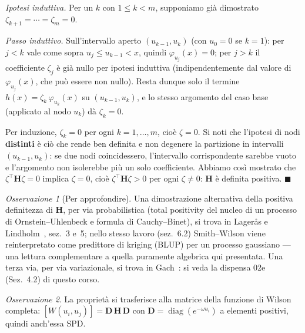 \documentclass[11pt,a4paper]{article}
\theoremstyle{plain}
\theoremstyle{definition}
\theoremstyle{remark}
\newtheorem*{osservazione}{Osservazione}
\newcommand{\Hmat}{\mathbf{H}}
\newcommand{\transp}{^{\!\top}}
\begin{document}
\emph{Ipotesi induttiva.} Per un $k$ con $1\le k<m$, supponiamo gi\`a dimostrato
$\zeta_{k+1}=\cdots=\zeta_m=0$.

\emph{Passo induttivo.} Sull'intervallo aperto $(u_{k-1},u_k)$ (con $u_0=0$ se $k=1$): per
$j<k$ vale come sopra $u_j\le u_{k-1}<x$, quindi $\varphi_{u_j}(x)=0$; per $j>k$ il
coefficiente $\zeta_j$ \`e gi\`a nullo per ipotesi induttiva (indipendentemente dal valore di
$\varphi_{u_j}(x)$, che pu\`o essere non nullo). Resta dunque solo il termine
$h(x)=\zeta_k\,\varphi_{u_k}(x)$ su $(u_{k-1},u_k)$, e lo stesso argomento del caso base
(applicato al nodo $u_k$) d\`a $\zeta_k=0$.

Per induzione, $\zeta_k=0$ per ogni $k=1,\ldots,m$, cio\`e $\zeta=0$. Si noti che l'ipotesi di
nodi \textbf{distinti} \`e ci\`o che rende ben definita e non degenere la partizione in
intervalli $(u_{k-1},u_k)$: se due nodi coincidessero, l'intervallo corrispondente sarebbe
vuoto e l'argomento non isolerebbe pi\`u un solo coefficiente. Abbiamo cos\`i mostrato che
$\zeta\transp\Hmat\zeta=0$ implica $\zeta=0$, cio\`e $\zeta\transp\Hmat\zeta>0$ per ogni
$\zeta\neq 0$: $\Hmat$ \`e definita positiva. $\blacksquare$

\begin{osservazione}[Per approfondire]
Una dimostrazione alternativa della positiva definitezza di $\Hmat$, per via probabilistica
(total positivity del nucleo di un processo di Ornstein--Uhlenbeck e formula di
Cauchy--Binet), si trova in Lager\aa s e Lindholm~\cite{lageras2016}, sez.~3 e~5; nello stesso
lavoro (sez.~6.2) Smith--Wilson viene reinterpretato come predittore di kriging (BLUP) per un
processo gaussiano --- una lettura complementare a quella puramente algebrica qui presentata.
Una terza via, per via variazionale, si trova in Gach~\cite{gach2017}: si veda la dispensa 02e
(Sez.~4.2) di questo corso.
\end{osservazione}

\begin{osservazione}
La propriet\`a si trasferisce alla matrice della funzione di Wilson completa:
$[W(u_i,u_j)] = \mathbf{D}\,\Hmat\,\mathbf{D}$ con
$\mathbf{D}=\operatorname{diag}(e^{-\omega u_i})$ a elementi positivi, quindi anch'essa SPD.
\end{osservazione}
\end{document}
